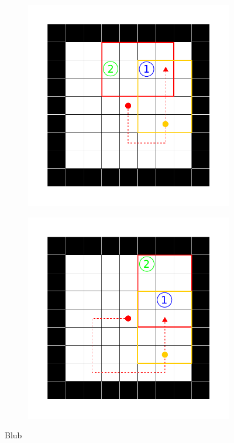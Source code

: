 \begin{figure}[ht!]
\begin{subfigure}[c]{0.5\textwidth}
    \subcaption{}
    \label{sample_visited}
  \end{subfigure}
  \begin{subfigure}[c]{0.5\textwidth}
    \includegraphics[keepaspectratio,width=\textwidth]{abbildungen/sample_seen.pdf}
    \subcaption{}
    \label{sample_seen2}
  \end{subfigure}
  \begin{subfigure}[c]{0.5\textwidth}
    \includegraphics[keepaspectratio,width=\textwidth]{abbildungen/sample_seen2.pdf}
    \subcaption{}
    \label{sample_seen2}
  \end{subfigure}
  \caption{Blub}
\end{figure}
